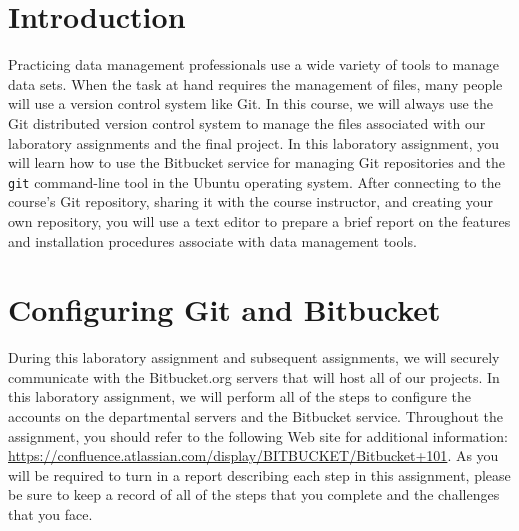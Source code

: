 


\usepackage[compact]{titlesec}



\section*{Introduction}

Practicing data management professionals use a wide variety of tools to manage data sets. When the task at hand requires
the management of files, many people will use a version control system like Git.  In this course, we will always use the
Git distributed version control system to manage the files associated with our laboratory assignments and the final
project.  In this laboratory assignment, you will learn how to use the Bitbucket service for managing Git repositories
and the {\tt git} command-line tool in the Ubuntu operating system. After connecting to the course's Git
repository, sharing it with the course instructor, and creating your own repository, you will use a text editor to
prepare a brief report on the features and installation procedures associate with data management tools.

\section*{Configuring Git and Bitbucket}

During this laboratory assignment and subsequent assignments, we will securely communicate with the Bitbucket.org
servers that will host all of our projects.  In this laboratory assignment, we will perform all of the steps to
configure the accounts on the departmental servers and the Bitbucket service.  Throughout the assignment, you should
refer to the following Web site for additional information:
\url{https://confluence.atlassian.com/display/BITBUCKET/Bitbucket+101}.  As you will be required to turn in a report
describing each step in this assignment, please be sure to keep a record of all of the steps that you complete and the
challenges that you face.

